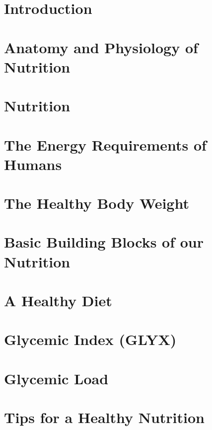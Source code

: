 \documentclass[../main.tex]{subfiles}
\begin{document}
\chapter{Introduction}


\chapter{Anatomy and Physiology of Nutrition}


\chapter{Nutrition}

\chapter{The Energy Requirements of Humans} %


\chapter{The Healthy Body Weight} %


\chapter{Basic Building Blocks of our Nutrition}

\chapter{A Healthy Diet}


\chapter{Glycemic Index (GLYX)}\label{chap:carbs}



\chapter{Glycemic Load}



\chapter{Tips for a Healthy Nutrition}
\end{document}
